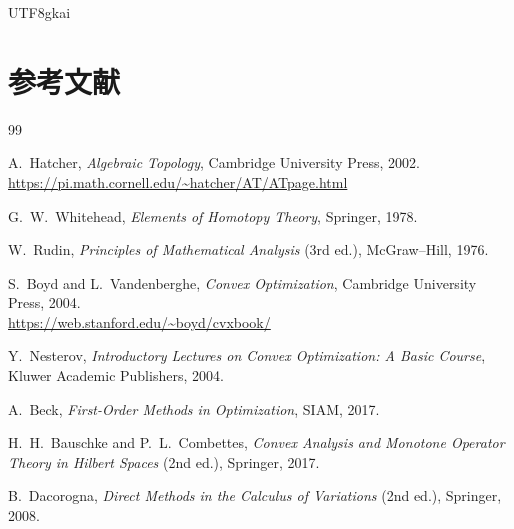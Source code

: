 \documentclass[12pt]{article}
\begin{document}
\begin{CJK*}{UTF8}{gkai}

\section*{参考文献}
\begin{thebibliography}{99}

A.\ Hatcher,
\emph{Algebraic Topology},
Cambridge University Press, 2002.
\\ \url{https://pi.math.cornell.edu/~hatcher/AT/ATpage.html}

G.\ W.\ Whitehead,
\emph{Elements of Homotopy Theory},
Springer, 1978.

W.\ Rudin,
\emph{Principles of Mathematical Analysis} (3rd ed.),
McGraw--Hill, 1976.

S.\ Boyd and L.\ Vandenberghe,
\emph{Convex Optimization},
Cambridge University Press, 2004.
\\ \url{https://web.stanford.edu/~boyd/cvxbook/}

Y.\ Nesterov,
\emph{Introductory Lectures on Convex Optimization: A Basic Course},
Kluwer Academic Publishers, 2004.

A.\ Beck,
\emph{First-Order Methods in Optimization},
SIAM, 2017.

H.\ H.\ Bauschke and P.\ L.\ Combettes,
\emph{Convex Analysis and Monotone Operator Theory in Hilbert Spaces} (2nd ed.),
Springer, 2017.

B.\ Dacorogna,
\emph{Direct Methods in the Calculus of Variations} (2nd ed.),
Springer, 2008.

\end{thebibliography}

\end{CJK*}
\end{document}
